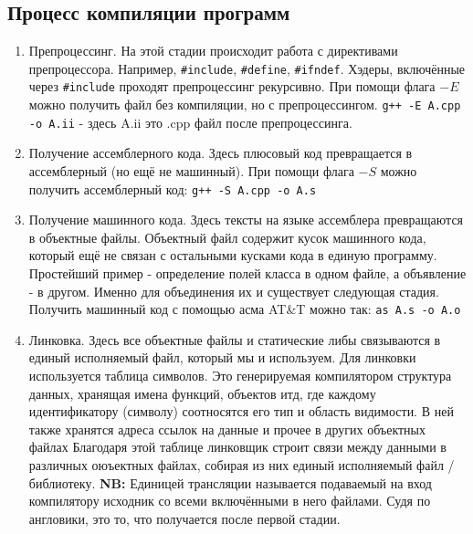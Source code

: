 \documentclass[15pt, a4paper]{article}
\newcommand{\nl}{\newline}
\begin{document}
    \subsection{Процесс компиляции программ}
    \begin{enumerate}
        \item Препроцессинг. \nl
        На этой стадии происходит работа с директивами препроцессора. Например, \texttt{\#include}, \texttt{\#define}, \texttt{\#ifndef}.    
        Хэдеры, включённые через \texttt{\#include} проходят препроцессинг рекурсивно. При помощи флага $-E$ можно получить файл без компиляции, но с препроцессингом. \nl
        \texttt{g++ -E A.cpp -o A.ii} - здесь A.ii это .cpp файл после препроцессинга.
        \item Получение ассемблерного кода. \nl
        Здесь плюсовый код превращается в ассемблерный (но ещё не машинный). При помощи флага $-S$ можно получить ассемблерный код:
        \texttt{g++ -S A.cpp -o A.s}
        \item Получение машинного кода. \nl
        Здесь тексты на языке ассемблера превращаются в объектные файлы. Объектный файл содержит кусок машинного кода, который ещё не связан с остальными кусками кода в единую программу.
        Простейший пример - определение полей класса в одном файле, а объявление - в другом. Именно для объединения их и существует следующая стадия.
        Получить машинный код с помощью асма AT\&T можно так: \texttt{as A.s -o A.o}
        \item Линковка. \nl
        Здесь все объектные файлы и статические либы связываются в единый исполняемый файл, который мы и используем.
        Для линковки используется таблица символов. Это генерируемая компилятором структура данных, хранящая имена функций, объектов итд,
        где каждому идентификатору (символу) соотносятся его тип и область видимости. В ней также хранятся адреса ссылок на данные и прочее в других объектных файлах
        Благодаря этой таблице линковщик строит связи между данными в различных оюъектных файлах, собирая из них единый исполняемый файл / библиотеку. \nl
        \textbf{NB:} Единицей трансляции называется подаваемый на вход компилятору исходник со всеми включёнными в него файлами. Судя по англовики, это то, что получается после первой стадии.
    \end{enumerate}
\end{document}

